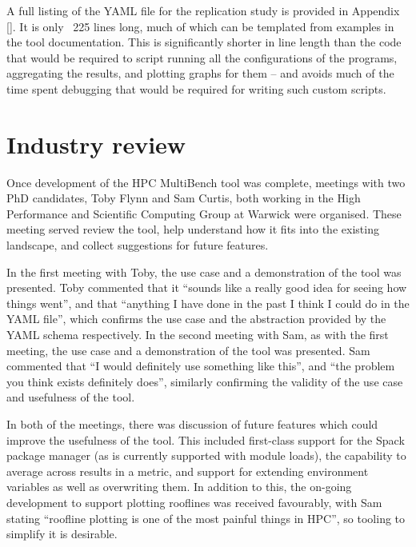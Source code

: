 A full listing of the YAML file for the replication study is provided in Appendix \ref{}. It is only ~225 lines long, much of which can be templated from examples in the tool documentation. This is significantly shorter in line length than the code that would be required to script running all the configurations of the programs, aggregating the results, and plotting graphs for them -- and avoids much of the time spent debugging that would be required for writing such custom scripts.





\section{Industry review}
\label{sec:hpc-multibench-industry-review} %

Once development of the HPC MultiBench tool was complete, meetings with two PhD candidates, Toby Flynn and Sam Curtis, both working in the High Performance and Scientific Computing Group at Warwick were organised. These meeting served review the tool, help understand how it fits into the existing landscape, and collect suggestions for future features.

In the first meeting with Toby, the use case and a demonstration of the tool was presented. Toby commented that it ``sounds like a really good idea for seeing how things went'', and that ``anything I have done in the past I think I could do in the YAML file'', which confirms the use case and the abstraction provided by the YAML schema respectively. In the second meeting with Sam, as with the first meeting, the use case and a demonstration of the tool was presented. Sam commented that ``I would definitely use something like this'', and ``the problem you think exists definitely does'', similarly confirming the validity of the use case and usefulness of the tool.


In both of the meetings, there was discussion of future features which could improve the usefulness of the tool. This included first-class support for the Spack package manager (as is currently supported with module loads), the capability to average across results in a metric, and support for extending environment variables as well as overwriting them. In addition to this, the on-going development to support plotting rooflines was received favourably, with Sam stating ``roofline plotting is one of the most painful things in HPC'', so tooling to simplify it is desirable.